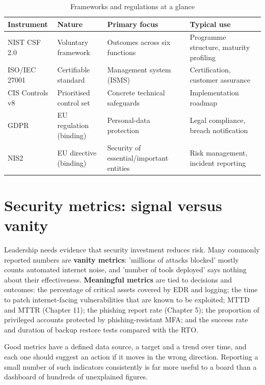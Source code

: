 \documentclass[11pt,openany]{book}
\begin{document}
\begin{table}[htbp]
  \centering\small
  \caption{Frameworks and regulations at a glance}
  \begin{tabularx}{\linewidth}{>{\raggedright\arraybackslash}X >{\raggedright\arraybackslash}X >{\raggedright\arraybackslash}X >{\raggedright\arraybackslash}X}
    \toprule
    \textbf{Instrument} & \textbf{Nature} & \textbf{Primary focus} & \textbf{Typical use} \\
    \midrule
    NIST CSF 2.0 & Voluntary framework & Outcomes across six functions & Programme structure, maturity profiling \\
    ISO/IEC 27001 & Certifiable standard & Management system (ISMS) & Certification, customer assurance \\
    CIS Controls v8 & Prioritised control set & Concrete technical safeguards & Implementation roadmap \\
    GDPR & EU regulation (binding) & Personal-data protection & Legal compliance, breach notification \\
    NIS2 & EU directive (binding) & Security of essential/important entities & Risk management, incident reporting \\
    \bottomrule
  \end{tabularx}
\end{table}
\section{Security metrics: signal versus vanity}\label{sec:13.5}
Leadership needs evidence that security investment reduces risk. Many commonly reported numbers are \textbf{vanity metrics}: 'millions of attacks blocked' mostly counts automated internet noise, and 'number of tools deployed' says nothing about their effectiveness. \textbf{Meaningful metrics} are tied to decisions and outcomes: the percentage of critical assets covered by EDR and logging; the time to patch internet-facing vulnerabilities that are known to be exploited; MTTD and MTTR (Chapter 11); the phishing report rate (Chapter 5); the proportion of privileged accounts protected by phishing-resistant MFA; and the success rate and duration of backup restore tests compared with the RTO.

Good metrics have a defined data source, a target and a trend over time, and each one should suggest an action if it moves in the wrong direction. Reporting a small number of such indicators consistently is far more useful to a board than a dashboard of hundreds of unexplained figures.
\end{document}
